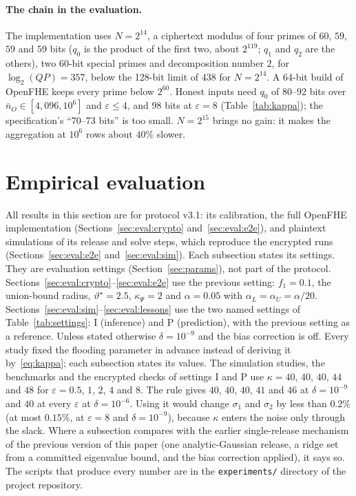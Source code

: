 \documentclass[11pt]{article}
\theoremstyle{definition}
\theoremstyle{plain}
\begin{document}
\paragraph{The chain in the evaluation.} The implementation uses $N = 2^{14}$, a ciphertext modulus of four primes of $60$, $59$, $59$ and $59$ bits ($q_0$ is the product of the first two, about $2^{119}$; $q_1$ and $q_2$ are the others), two 60-bit special primes and decomposition number $2$, for $\log_2(QP) = 357$, below the 128-bit limit of $438$ for $N = 2^{14}$. A 64-bit build of OpenFHE keeps every prime below $2^{60}$. Honest inputs need $q_0$ of $80$--$92$ bits over $\bar n_O \in [4{,}096, 10^6]$ and $\varepsilon \le 4$, and $98$ bits at $\varepsilon = 8$ (Table~\ref{tab:kappa}); the specification's ``70--73 bits'' is too small. $N = 2^{15}$ brings no gain: it makes the aggregation at $10^6$ rows about $40\%$ slower.

\FloatBarrier

\section{Empirical evaluation}
\label{sec:eval}

All results in this section are for protocol v3.1: its calibration, the full OpenFHE implementation (Sections~\ref{sec:eval:crypto} and~\ref{sec:eval:e2e}), and plaintext simulations of its release and solve steps, which reproduce the encrypted runs (Sections~\ref{sec:eval:e2e} and~\ref{sec:eval:sim}). Each subsection states its settings. They are evaluation settings (Section~\ref{sec:params}), not part of the protocol. Sections~\ref{sec:eval:crypto}--\ref{sec:eval:e2e} use the previous setting: $f_1 = 0.1$, the union-bound radius, $\vartheta^\star = 2.5$, $\kappa_\Psi = 2$ and $\alpha = 0.05$ with $\alpha_L = \alpha_U = \alpha/20$. Sections~\ref{sec:eval:sim}--\ref{sec:eval:lessons} use the two named settings of Table~\ref{tab:settings}: I (inference) and P (prediction), with the previous setting as a reference. Unless stated otherwise $\delta = 10^{-9}$ and the bias correction is off. Every study fixed the flooding parameter in advance instead of deriving it by~\eqref{eq:kappa}; each subsection states its values. The simulation studies, the benchmarks and the encrypted checks of settings I and P use $\kappa = 40$, $40$, $40$, $44$ and $48$ for $\varepsilon = 0.5$, $1$, $2$, $4$ and $8$. The rule gives $40$, $40$, $40$, $41$ and $46$ at $\delta = 10^{-9}$ and $40$ at every $\varepsilon$ at $\delta = 10^{-6}$. Using it would change $\sigma_1$ and $\sigma_2$ by less than $0.2\%$ (at most $0.15\%$, at $\varepsilon = 8$ and $\delta = 10^{-9}$), because $\kappa$ enters the noise only through the slack. Where a subsection compares with the earlier single-release mechanism of the previous version of this paper (one analytic-Gaussian release, a ridge set from a committed eigenvalue bound, and the bias correction applied), it says so. The scripts that produce every number are in the \texttt{experiments/} directory of the project repository.
\end{document}
